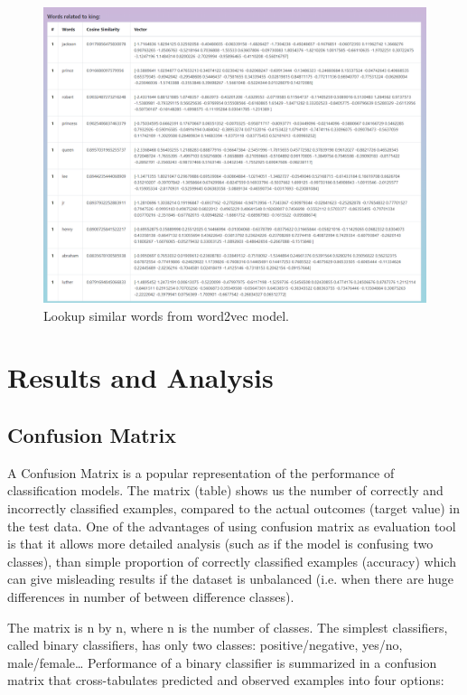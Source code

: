 \begin{figure}[tbh]
\begin{center}
	\includegraphics[width=5.85in]{images/outputs/lookup.png}
	\caption{Lookup similar words from word2vec model.}
	\label{lookup}
\end{center}
\end{figure}

\newpage
\chapter{Results and Analysis}
\section{Confusion Matrix}
A Confusion Matrix is a popular representation of the performance of classification models. The matrix (table) shows us the number of correctly and incorrectly classified examples, compared to the actual outcomes (target value) in the test data. One of the advantages of using confusion matrix as evaluation tool is that it allows more detailed analysis (such as if the model is confusing two classes), than simple proportion of correctly classified examples (accuracy) which can give misleading results if the dataset is unbalanced (i.e. when there are huge differences in number of between difference classes).

The matrix is n by n, where n is the number of classes. The simplest classifiers, called binary classifiers, has only two classes: positive/negative, yes/no, male/female… Performance of a binary classifier is summarized in a confusion matrix that cross-tabulates predicted and observed examples into four options:

